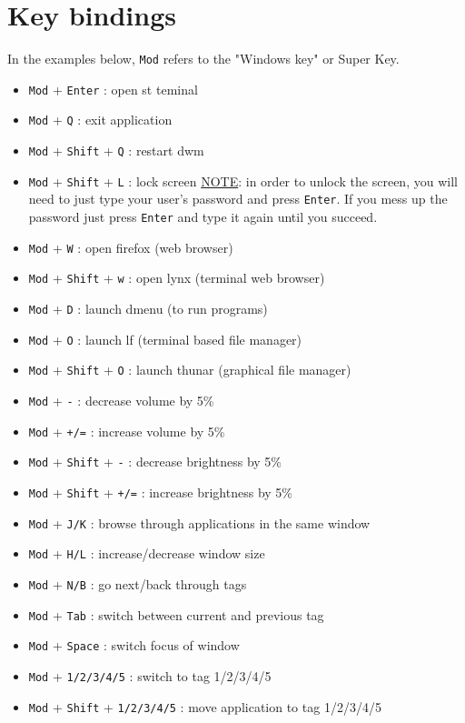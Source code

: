 \documentclass[11pt]{article}
\begin{document}
\section{Key bindings}

In the examples below, \texttt{Mod} refers to the "Windows key" or Super Key.
\newline
\begin{itemize}
	\item \texttt{Mod} + \texttt{Enter} : open st teminal
	\item \texttt{Mod} + \texttt{Q} : exit application
	\item \texttt{Mod} + \texttt{Shift} + \texttt{Q} : restart dwm
	\item \texttt{Mod} + \texttt{Shift} + \texttt{L} : lock screen
	\newline
	\newline
	\underline{NOTE}: in order to unlock the screen, you will need
	to just type your user's password and press \texttt{Enter}. If you
	mess up the password just press \texttt{Enter} and type it again
	until you succeed.
	\item \texttt{Mod} + \texttt{W} : open firefox (web browser)
	\item \texttt{Mod} + \texttt{Shift} + \texttt{w} : open lynx (terminal web browser)
	\item \texttt{Mod} + \texttt{D} : launch dmenu (to run programs)
	\item \texttt{Mod} + \texttt{O} : launch lf (terminal based file manager)
	\item \texttt{Mod} + \texttt{Shift} + \texttt{O} : launch thunar (graphical file manager)
	\item \texttt{Mod} + \texttt{-} : decrease volume by 5\%
	\item \texttt{Mod} + \texttt{+/=} : increase volume by 5\%
	\item \texttt{Mod} + \texttt{Shift} + \texttt{-} : decrease brightness by 5\%
	\item \texttt{Mod} + \texttt{Shift} + \texttt{+/=} : increase brightness by 5\%
	\item \texttt{Mod} + \texttt{J/K} : browse through applications in the same window
	\item \texttt{Mod} + \texttt{H/L} : increase/decrease window size
	\item \texttt{Mod} + \texttt{N/B} : go next/back through tags
	\item \texttt{Mod} + \texttt{Tab} : switch between current and previous tag
	\item \texttt{Mod} + \texttt{Space} : switch focus of window
	\item \texttt{Mod} + \texttt{1/2/3/4/5} : switch to tag 1/2/3/4/5
	\item \texttt{Mod} + \texttt{Shift} + \texttt{1/2/3/4/5} : move application to tag 1/2/3/4/5	
\end{itemize}
\end{document}

